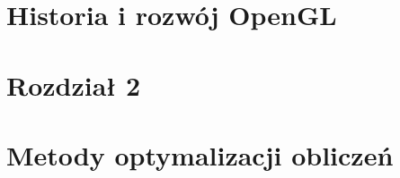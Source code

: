 \documentclass[12pt]{article}
\begin{document}
\baselineskip





\section{Historia i rozwój OpenGL}




\section{Rozdział 2}
\newpage

\section{Metody optymalizacji obliczeń}



\end{document}
